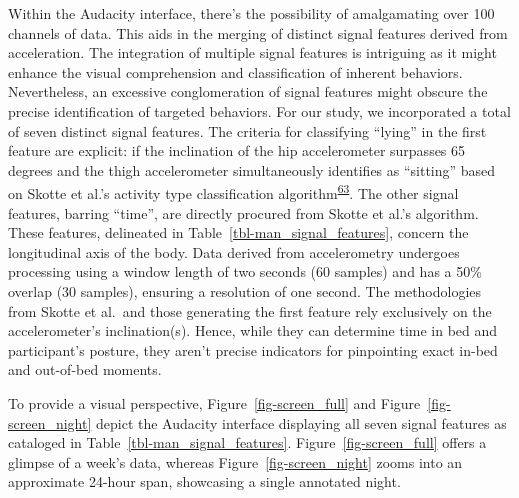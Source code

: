 \documentclass[
  10pt,
]{scrbook}
\begin{document}
Within the Audacity interface, there's the possibility of amalgamating
over 100 channels of data. This aids in the merging of distinct signal
features derived from acceleration. The integration of multiple signal
features is intriguing as it might enhance the visual comprehension and
classification of inherent behaviors. Nevertheless, an excessive
conglomeration of signal features might obscure the precise
identification of targeted behaviors. For our study, we incorporated a
total of seven distinct signal features. The criteria for classifying
``lying'' in the first feature are explicit: if the inclination of the
hip accelerometer surpasses 65 degrees and the thigh accelerometer
simultaneously identifies as ``sitting'' based on Skotte et al.'s
activity type classification
algorithm\textsuperscript{\protect\hyperlink{ref-skotte_detection_2014}{63}}.
The other signal features, barring ``time'', are directly procured from
Skotte et al.'s algorithm. These features, delineated in
Table~\ref{tbl-man_signal_features}, concern the longitudinal axis of
the body. Data derived from accelerometry undergoes processing using a
window length of two seconds (60 samples) and has a 50\% overlap (30
samples), ensuring a resolution of one second. The methodologies from
Skotte et al.~and those generating the first feature rely exclusively on
the accelerometer's inclination(s). Hence, while they can determine time
in bed and participant's posture, they aren't precise indicators for
pinpointing exact in-bed and out-of-bed moments.

To provide a visual perspective, Figure~\ref{fig-screen_full} and
Figure~\ref{fig-screen_night} depict the Audacity interface displaying
all seven signal features as cataloged in
Table~\ref{tbl-man_signal_features}. Figure~\ref{fig-screen_full} offers
a glimpse of a week's data, whereas Figure~\ref{fig-screen_night} zooms
into an approximate 24-hour span, showcasing a single annotated night.

\begingroup

\footnotesize
\end{document}
